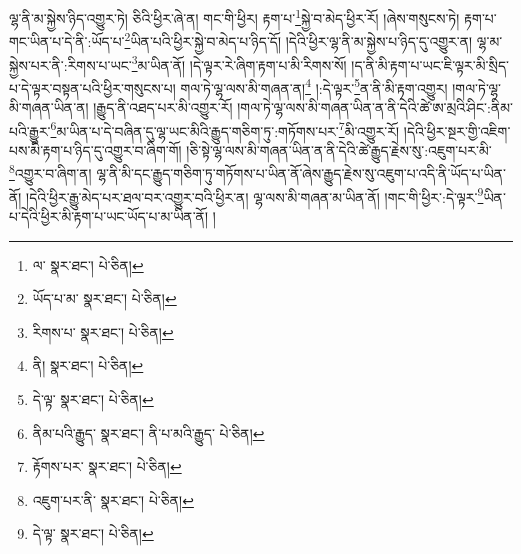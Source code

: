 ལྷ་ནི་མ་སྐྱེས་ཉིད་འགྱུར་ཏེ། ཅིའི་ཕྱིར་ཞེ་ན། གང་གི་ཕྱིར། རྟག་པ་\footnote{ལ་  སྣར་ཐང་།  པེ་ཅིན། }སྐྱེ་བ་མེད་ཕྱིར་རོ། །ཞེས་གསུངས་ཏེ། རྟག་པ་གང་ཡིན་པ་དེ་ནི་:ཡོད་པ་\footnote{ཡོད་པ་མ་  སྣར་ཐང་།  པེ་ཅིན། }ཡིན་པའི་ཕྱིར་སྐྱེ་བ་མེད་པ་ཉིད་དོ། །དེའི་ཕྱིར་ལྷ་ནི་མ་སྐྱེས་པ་ཉིད་དུ་འགྱུར་ན། ལྷ་མ་སྐྱེས་པར་ནི་:རིགས་པ་ཡང་\footnote{རིགས་པ་  སྣར་ཐང་།  པེ་ཅིན། }མ་ཡིན་ནོ། །དེ་ལྟར་རེ་ཞིག་རྟག་པ་མི་རིགས་སོ། །ད་ནི་མི་རྟག་པ་ཡང་ཇི་ལྟར་མི་སྲིད་པ་དེ་ལྟར་བསྟན་པའི་ཕྱིར་གསུངས་པ། གལ་ཏེ་ལྷ་ལས་མི་གཞན་ན།\footnote{ནི།  སྣར་ཐང་།  པེ་ཅིན། } །:དེ་ལྟར་\footnote{དེ་ལྟ་  སྣར་ཐང་།  པེ་ཅིན། }ན་ནི་མི་རྟག་འགྱུར། །གལ་ཏེ་ལྷ་མི་གཞན་ཡིན་ན། །རྒྱུད་ནི་འཐད་པར་མི་འགྱུར་རོ། །གལ་ཏེ་ལྷ་ལས་མི་གཞན་ཡིན་ན་ནི་དེའི་ཚེ་ཨ་མྲའི་ཤིང་:ནིམ་པའི་རྒྱུར་\footnote{ནིམ་པའི་རྒྱུད་  སྣར་ཐང་། ནི་པ་མའི་རྒྱུད་  པེ་ཅིན། }མ་ཡིན་པ་དེ་བཞིན་དུ་ལྷ་ཡང་མིའི་རྒྱུད་གཅིག་ཏུ་:གཏོགས་པར་\footnote{རྟོགས་པར་  སྣར་ཐང་།  པེ་ཅིན། }མི་འགྱུར་རོ། །དེའི་ཕྱིར་སྔར་གྱི་འཇིག་པས་མི་རྟག་པ་ཉིད་དུ་འགྱུར་བ་ཞིག་གོ། །ཅི་སྟེ་ལྷ་ལས་མི་གཞན་ཡིན་ན་ནི་དེའི་ཚེ་རྒྱུད་རྗེས་སུ་:འཇུག་པར་མི་\footnote{འཇུག་པར་ནི་  སྣར་ཐང་།  པེ་ཅིན། }འགྱུར་བ་ཞིག་ན། ལྷ་ནི་མི་དང་རྒྱུད་གཅིག་ཏུ་གཏོགས་པ་ཡིན་ནོ་ཞེས་རྒྱུད་རྗེས་སུ་འཇུག་པ་འདི་ནི་ཡོད་པ་ཡིན་ནོ། །དེའི་ཕྱིར་རྒྱུ་མེད་པར་ཐལ་བར་འགྱུར་བའི་ཕྱིར་ན། ལྷ་ལས་མི་གཞན་མ་ཡིན་ནོ། །གང་གི་ཕྱིར་:དེ་ལྟར་\footnote{དེ་ལྟ་  སྣར་ཐང་།  པེ་ཅིན། }ཡིན་པ་དེའི་ཕྱིར་མི་རྟག་པ་ཡང་ཡོད་པ་མ་ཡིན་ནོ། །
